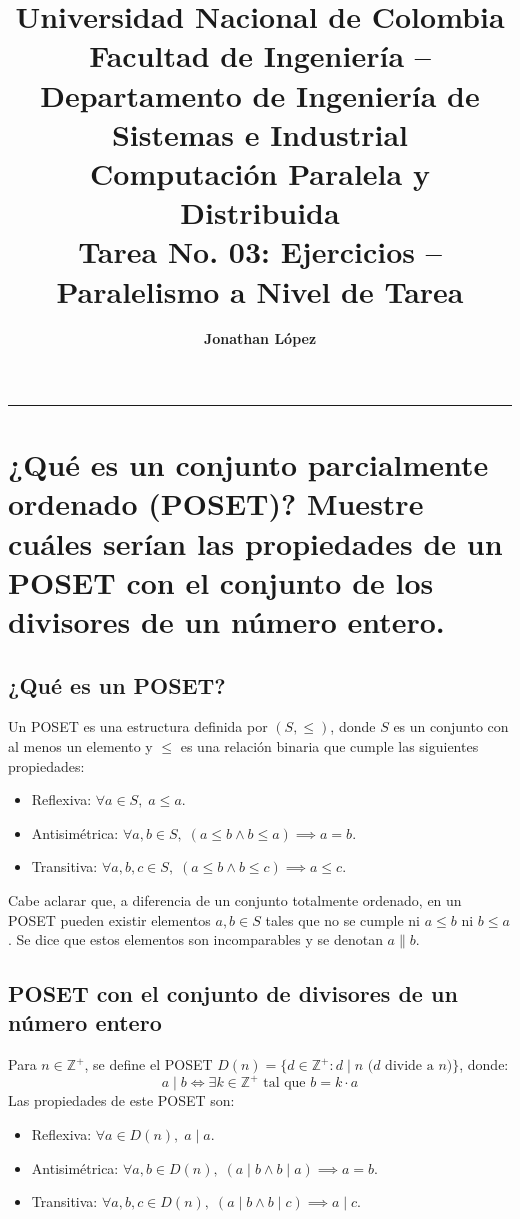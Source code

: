 \documentclass[11pt,a4paper]{article}
\title{\textbf{Universidad Nacional de Colombia}\\[0.3em]
\Large \textbf{Facultad de Ingeniería -- Departamento de Ingeniería de Sistemas e Industrial}\\[0.3em]
\large \textbf{Computación Paralela y Distribuida}\\
\large \textbf{Tarea No. 03: Ejercicios -- Paralelismo a Nivel de Tarea}}
\author{\textbf{Jonathan López}}
\date{}
\begin{document}
\maketitle

\vspace{1em}
\hrule
\vspace{1.5em}

\section{¿Qué es un conjunto parcialmente ordenado (POSET)? Muestre cuáles serían las propiedades de un POSET con el conjunto de los divisores de un número entero.}
\subsection{¿Qué es un POSET?}
Un POSET es una estructura definida por $(S, \leq)$, donde $S$ es un conjunto con al menos un elemento y $\leq$ es una relación binaria que cumple las siguientes propiedades:
\begin{itemize}
    \item Reflexiva: $\forall a \in S,\; a \leq a$.
    \item Antisimétrica: $\forall a, b \in S,\; (a \leq b \wedge b \leq a) \implies a = b$.
    \item Transitiva: $\forall a, b, c \in S,\; (a \leq b \wedge b \leq c) \implies a \leq c$.
\end{itemize}
Cabe aclarar que, a diferencia de un conjunto totalmente ordenado, en un POSET pueden existir elementos $a, b \in S$ tales que no se cumple ni $a \leq b$ ni $b \leq a$. Se dice que estos elementos son incomparables y se denotan $a \parallel b$.

\subsection{POSET con el conjunto de divisores de un número entero}
Para $n \in \mathbb{Z}^+$, se define el POSET $D(n) = \{d \in \mathbb{Z}^+ : d \mid n \text{ ($d$ divide a $n$)}\}$, donde:
\[ a \mid b \iff \exists k \in \mathbb{Z}^+ \text{ tal que } b = k \cdot a \]
Las propiedades de este POSET son:
\begin{itemize}
    \item Reflexiva: $\forall a \in D(n),\; a \mid a$.
    \item Antisimétrica: $\forall a, b \in D(n),\; (a \mid b \wedge b \mid a) \implies a = b$.
    \item Transitiva: $\forall a, b, c \in D(n),\; (a \mid b \wedge b \mid c) \implies a \mid c$.
\end{itemize}
\end{document}
